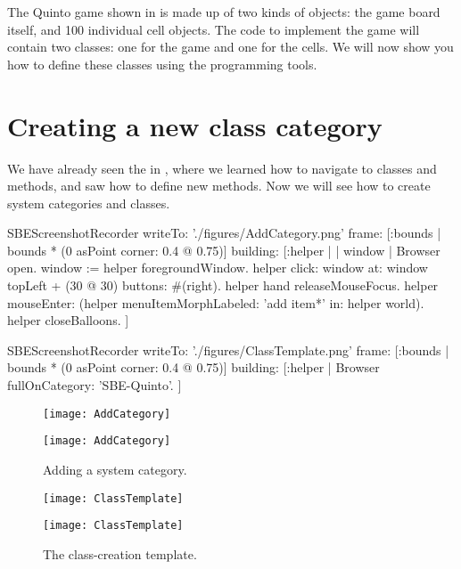 \documentclass[a4paper,10pt,twoside]{book}
\begin{document}
The Quinto game shown in  is made up of two kinds of objects: the game board itself, and 100 individual cell objects.
The \squeak code to implement the game will contain two classes: one for the game and one for the cells.
We will now show you how to define these classes using the \squeak programming tools.

\section{Creating a new class category}

We have already seen the  in , where we learned how to navigate to classes and methods, and saw how to define new methods.
Now we will see how to create system categories and classes.


\begin{ExecuteSmalltalkScript}
SBEScreenshotRecorder writeTo: './figures/AddCategory.png' frame: [:bounds | bounds * (0 asPoint corner: 0.4 @ 0.75)] building: [:helper |
	| window |
	Browser open.
	window := helper foregroundWindow.
	helper click: window at: window topLeft + (30 @ 30) buttons: #(right).
	helper hand releaseMouseFocus.
	helper mouseEnter: (helper menuItemMorphLabeled: 'add item*' in: helper world).
	helper closeBalloons.
]
\end{ExecuteSmalltalkScript}
\begin{ExecuteSmalltalkScript}
SBEScreenshotRecorder writeTo: './figures/ClassTemplate.png' frame: [:bounds | bounds * (0 asPoint corner: 0.4 @ 0.75)] building: [:helper |
	Browser fullOnCategory: 'SBE-Quinto'.
]
\end{ExecuteSmalltalkScript}
\begin{figure}[htb]
\begin{minipage}[b]{0.48\textwidth}
\ifluluelse
	{\centerline {\texttt{[image: AddCategory]}}}
	{\centerline {\texttt{[image: AddCategory]}}}
	\caption{Adding a system category.
	\label{fig:addCategory}}
\end{minipage}
\hfill
\begin{minipage}[b]{0.48\textwidth}
\ifluluelse
	{\centerline {\texttt{[image: ClassTemplate]}}}
	{\centerline {\texttt{[image: ClassTemplate]}}}
	\caption{The class-creation template.
	\label{fig:classTemplate}}
\end{minipage}
\end{figure}
\end{document}
